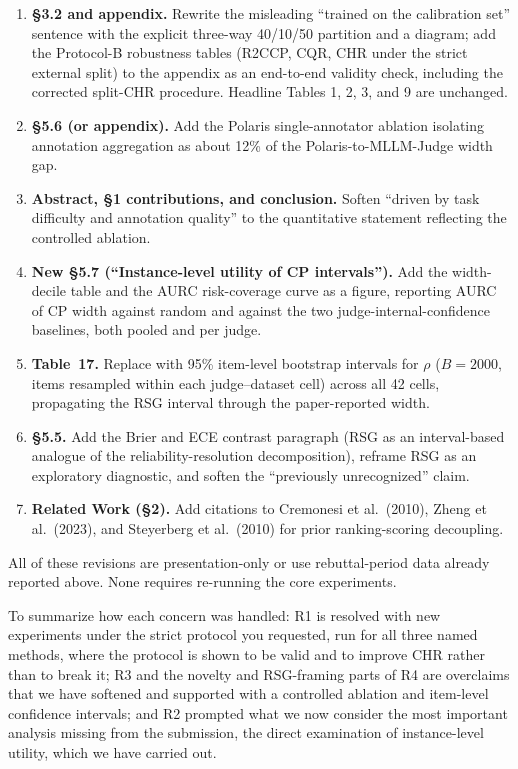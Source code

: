 \documentclass[11pt]{article}
\begin{document}
\begin{enumerate}[leftmargin=*]
\item \textbf{\S 3.2 and appendix.} Rewrite the misleading ``trained on the calibration set'' sentence with the explicit three-way 40/10/50 partition and a diagram; add the Protocol-B robustness tables (R2CCP, CQR, CHR under the strict external split) to the appendix as an end-to-end validity check, including the corrected split-CHR procedure. Headline Tables 1, 2, 3, and 9 are unchanged.
\item \textbf{\S 5.6 (or appendix).} Add the Polaris single-annotator ablation isolating annotation aggregation as about 12\% of the Polaris-to-MLLM-Judge width gap.
\item \textbf{Abstract, \S 1 contributions, and conclusion.} Soften ``driven by task difficulty and annotation quality'' to the quantitative statement reflecting the controlled ablation.
\item \textbf{New \S 5.7 (``Instance-level utility of CP intervals'').} Add the width-decile table and the AURC risk-coverage curve as a figure, reporting AURC of CP width against random and against the two judge-internal-confidence baselines, both pooled and per judge.
\item \textbf{Table~17.} Replace with 95\% item-level bootstrap intervals for $\rho$ ($B = 2000$, items resampled within each judge--dataset cell) across all 42 cells, propagating the RSG interval through the paper-reported width.
\item \textbf{\S 5.5.} Add the Brier and ECE contrast paragraph (RSG as an interval-based analogue of the reliability-resolution decomposition), reframe RSG as an exploratory diagnostic, and soften the ``previously unrecognized'' claim.
\item \textbf{Related Work (\S 2).} Add citations to Cremonesi et al.\ (2010), Zheng et al.\ (2023), and Steyerberg et al.\ (2010) for prior ranking-scoring decoupling.
\end{enumerate}

All of these revisions are presentation-only or use rebuttal-period data already reported above. None requires re-running the core experiments.

To summarize how each concern was handled: R1 is resolved with new experiments under the strict protocol you requested, run for all three named methods, where the protocol is shown to be valid and to improve CHR rather than to break it; R3 and the novelty and RSG-framing parts of R4 are overclaims that we have softened and supported with a controlled ablation and item-level confidence intervals; and R2 prompted what we now consider the most important analysis missing from the submission, the direct examination of instance-level utility, which we have carried out.
\end{document}
